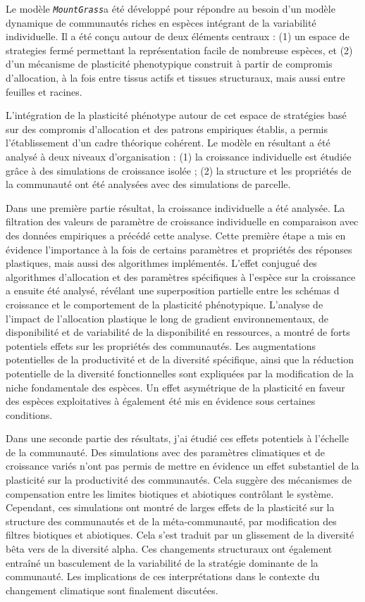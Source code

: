 \documentclass[a4paper, notoc, justified,marginals=left, nobib]{tufte-book}
\newcommand{\model}{\textit{\texttt{MountGrass}}}
\begin{document}
\begin{fullwidth}
Le modèle \model a été développé pour répondre au besoin d'un modèle dynamique de communautés riches en espèces intégrant de la variabilité individuelle. Il a été conçu autour de deux éléments centraux : (1) un espace de strategies fermé permettant la représentation facile de nombreuse espèces, et (2) d'un mécanisme de plasticité phenotypique construit à partir de compromis d'allocation, à la fois entre tissus actifs et tissues structuraux, mais aussi entre feuilles et racines.

L'intégration de la plasticité phénotype autour de cet espace de stratégies basé sur des compromis d'allocation et des patrons empiriques établis, a permis l'établissement d'un cadre théorique cohérent. Le modèle en résultant a été analysé à deux niveaux d'organisation : (1) la croissance individuelle est étudiée grâce à des simulations de croissance isolée ; (2) la structure et les propriétés de la communauté ont été analysées avec des simulations de parcelle.

Dans une première partie résultat, la croissance individuelle a été analysée. La filtration des valeurs de paramètre de croissance individuelle en comparaison avec des données empiriques a précédé cette analyse. Cette première étape a mis en évidence l'importance à la fois de certains paramètres et propriétés des réponses plastiques, mais aussi des algorithmes implémentés. L'effet conjugué des algorithmes d'allocation et des paramètres spécifiques à l'espèce sur la croissance a ensuite été analysé, révélant une superposition partielle entre les schémas d croissance et le comportement de la plasticité phénotypique. L'analyse de l'impact de l'allocation plastique le long de gradient environnementaux, de disponibilité et de variabilité de la disponibilité en ressources, a montré de forts potentiels effets sur les propriétés des communautés. Les augmentations potentielles de la productivité et de la diversité spécifique, ainsi que la réduction potentielle de la diversité fonctionnelles sont expliquées par la modification de la niche fondamentale des espèces. Un effet asymétrique de la plasticité en faveur des espèces exploitatives à également été mis en évidence sous certaines conditions.

Dans une seconde partie des résultats, j'ai étudié ces effets potentiels à l'échelle de la communauté. Des simulations avec des paramètres climatiques et de croissance variés n'ont pas permis de mettre en évidence un effet substantiel de la plasticité sur la productivité des communautés. Cela suggère des mécanismes de compensation entre les limites biotiques et abiotiques contrôlant le système. Cependant, ces simulations ont montré de larges effets de la plasticité sur la structure des communautés et de la méta-communauté, par modification des filtres biotiques et abiotiques. Cela s'est traduit par un glissement de la diversité bêta vers de la diversité alpha. Ces changements structuraux ont également entraîné un basculement de la variabilité de la stratégie dominante de la communauté. Les implications de ces interprétations dans le contexte du changement climatique sont finalement discutées.


\end{fullwidth}
\end{document}
